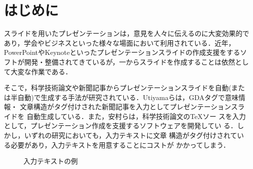 \maketitle
\thispagestyle{empty}


\section{はじめに}
\label{sec:intro}

スライドを用いたプレゼンテーションは，意見を人々に伝えるのに大変効果的で
あり，学会やビジネスといった様々な場面において利用されている．近年，
PowerPointやKeynoteといったプレゼンテーションスライドの作成支援をするソ
フトが開発・整備されてきているが，一からスライドを作成することは依然とし
て大変な作業である．

そこで，科学技術論文や新聞記事からプレゼンテーションスライドを自動(また
は半自動)で生成する手法が研究されている．Utiyamaらは，GDAタグで意味情報・
文章構造がタグ付けされた新聞記事を入力としてプレゼンテーションスライドを
自動生成している\cite{Utiyama99}．また，安村らは，科学技術論文の\TeX ソー
スを入力として，プレゼンテーション作成を支援するソフトウェアを開発してい
る\cite{Yasumura03j}．しかし，いずれの研究においても，入力テキストに文章
構造がタグ付けされている必要があり，入力テキストを用意することにコストが
かかってしまう．

\begin{figure}[t]
\caption{入力テキストの例}
\label{fig:text_example}
\end{figure}

